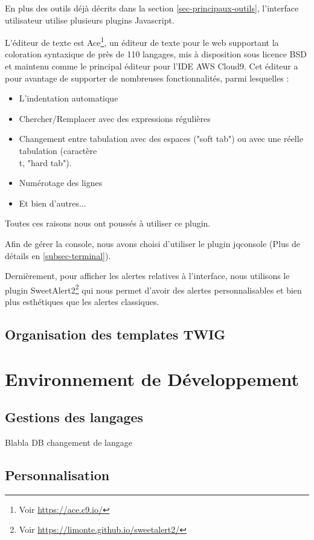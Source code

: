 En plus des outils déjà décrits dans la section \ref{sec-principaux-outils}, l'interface utilisateur utilise plusieurs plugins Javascript.

L'éditeur de texte est Ace\footnote{Voir \url{https://ace.c9.io/}}, un éditeur de texte pour le web supportant la coloration syntaxique de près de 110 langages, mis à disposition sous licence BSD et maintenu comme le principal éditeur pour l'IDE AWS Cloud9. Cet éditeur a pour avantage de supporter de nombreuses fonctionnalités, parmi lesquelles :
\

\begin{itemize}
  \item L'indentation automatique
  \item Chercher/Remplacer avec des expressions régulières
  \item Changement entre tabulation avec des espaces ("soft tab") ou avec une réelle tabulation (caractère \\t, "hard tab").
  \item Numérotage des lignes
  \item Et bien d'autres...
\end{itemize}

Toutes ces raisons nous ont poussés à utiliser ce plugin.

Afin de gérer la console, nous avons choisi d'utiliser le plugin jqconsole (Plus de détails en \ref{subsec-terminal}).

Dernièrement, pour afficher les alertes relatives à l'interface, nous utilisons le plugin SweetAlert2\footnote{Voir \url{https://limonte.github.io/sweetalert2/}} qui nous permet d'avoir des alertes personnalisables et bien plus esthétiques que les alertes classiques.

\subsection{Organisation des templates TWIG}

\section{Environnement de Développement}

\subsection{Gestions des langages}
Blabla DB changement de langage

\subsection{Personnalisation}

